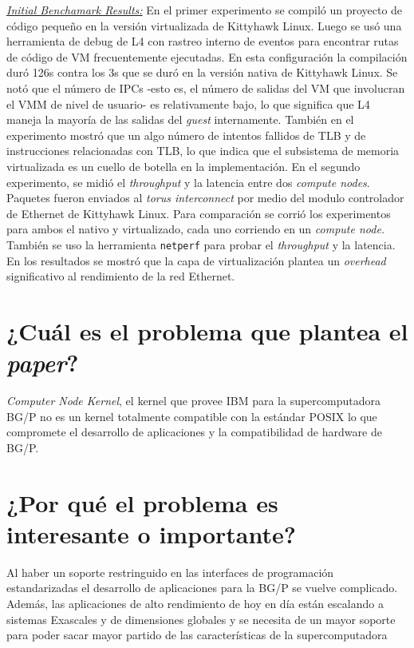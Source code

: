 \underline{\emph{Initial Benchamark Results:}} En el primer experimento se compiló un proyecto de código pequeño en la versión virtualizada de Kittyhawk Linux. Luego se usó una herramienta de debug de L4 con rastreo interno de eventos para encontrar rutas de código de VM frecuentemente ejecutadas. En esta configuración la compilación duró 126s contra los 3s que se duró en la versión nativa de Kittyhawk Linux. Se notó que el número de IPCs -esto es, el número de salidas del VM que involucran el VMM de nivel de usuario- es relativamente bajo, lo que significa que L4 maneja la mayoría de las salidas del \emph{guest} internamente. También en el experimento mostró que un algo número de intentos fallidos de TLB y de instrucciones relacionadas con TLB, lo que indica que el subsistema de memoria virtualizada es un cuello de botella en la implementación. En el segundo experimento, se midió el \emph{throughput} y la latencia entre dos \emph{compute nodes}. Paquetes fueron enviados al \emph{torus interconnect} por medio del modulo controlador de Ethernet de Kittyhawk Linux. Para comparación se corrió los experimentos para ambos el nativo y virtualizado, cada uno corriendo en un \emph{compute node.} También se uso la herramienta \texttt{netperf} para probar el \emph{throughput} y la latencia. En los resultados se mostró que la capa de virtualización plantea un \emph{overhead} significativo al rendimiento de la red Ethernet. 


\section{¿Cuál es el problema que plantea el \textit{paper}?}
\emph{Computer Node Kernel}, el kernel que provee IBM para la supercomputadora BG/P no es un kernel totalmente compatible con la estándar POSIX lo que compromete el desarrollo de aplicaciones y la compatibilidad de hardware de BG/P.

\section{¿Por qué el problema es interesante o importante?}
Al haber un soporte restringuido en las interfaces de programación estandarizadas el desarrollo de aplicaciones para la BG/P se vuelve complicado. Además, las aplicaciones de alto rendimiento de hoy en día están escalando a sistemas Exascales y de dimensiones globales y se necesita de un mayor soporte para poder sacar mayor partido de las características de la supercomputadora

